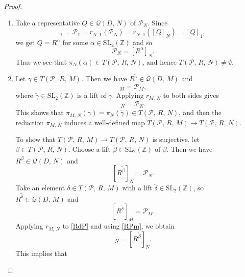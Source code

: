 \documentclass[reqno,11pt]{article}
\theoremstyle{plain} %
\theoremstyle{definition} %
\begin{document}
\begin{proof}
\begin{enumerate}
\item[(i)] Take a representative $Q\in\mathcal{Q}(D,\,N)$ of $\mathcal{P}_N$.
Since
\begin{equation*}
[R]_1=\mathcal{P}_1=r_{N,\,1}(\mathcal{P}_N)=r_{N,\,1}([Q]_N)=
[Q]_1,
\end{equation*}
we get
$Q=R^\alpha$ for some $\alpha\in\mathrm{SL}_2(\mathbb{Z})$ and so
\begin{equation*}
\mathcal{P}_N=[R^\alpha]_N. 
\end{equation*}
Thus we see that $\pi_N(\alpha)\in T(\mathcal{P},\,R,\,N)$,
and hence $T(\mathcal{P},\,R,\,N)\neq\emptyset$. 
\item[(ii)] Let $\gamma\in T(\mathcal{P},\,R,\,M)$. Then we have $R^{\widetilde{\gamma}}\in\mathcal{Q}(D,\,M)$
and
\begin{equation*}
[R^{\widetilde{\gamma}}]_M=\mathcal{P}_M,
\end{equation*}
where $\widetilde{\gamma}\in\mathrm{SL}_2(\mathbb{Z})$ is a lift of $\gamma$. 
Applying $r_{M,\,N}$ to both sides gives 
\begin{equation*}
[R^{\widetilde{\gamma}}]_N=\mathcal{P}_N. 
\end{equation*}
This shows that 
$\pi_{M,\,N}(\gamma)=\pi_N(\widetilde{\gamma})\in T(\mathcal{P},\,R,\,N)$, and then
the reduction $\pi_{M,\,N}$ induces a well-defined map 
$T(\mathcal{P},\,R,\,M)\rightarrow
T(\mathcal{P},\,R,\,N)$.
\par
To show that  $T(\mathcal{P},\,R,\,M)\rightarrow T(\mathcal{P},\,R,\,N)$ is surjective, 
let $\beta\in T(\mathcal{P},\,R,\,N)$. 
Choose a lift $\widetilde{\beta}\in\mathrm{SL}_2(\mathbb{Z})$ of $\beta$. Then we have
$R^{\widetilde{\beta}}\in\mathcal{Q}(D,\,N)$ and
\begin{equation}\label{RPm}
[R^{\widetilde{\beta}}]_N=\mathcal{P}_N. 
\end{equation}
Take an element 
$\delta\in T(\mathcal{P},\,R,\,M)$ with a lift $\widetilde{\delta}\in\mathrm{SL}_2(\mathbb{Z})$, so
$R^{\widetilde{\delta}}\in\mathcal{Q}(D,\,M)$ and
\begin{equation}\label{RdP}
[R^{\widetilde{\delta}}]_M=\mathcal{P}_M. 
\end{equation} 
Applying $r_{M,\,N}$ to \eqref{RdP} and using \eqref{RPm}, we obtain
\begin{equation*}
[R^{\widetilde{\delta}}]_N=[R^{\widetilde{\beta}}]_N.
\end{equation*}
This implies that

\end{enumerate}
\end{proof}
\end{document}
